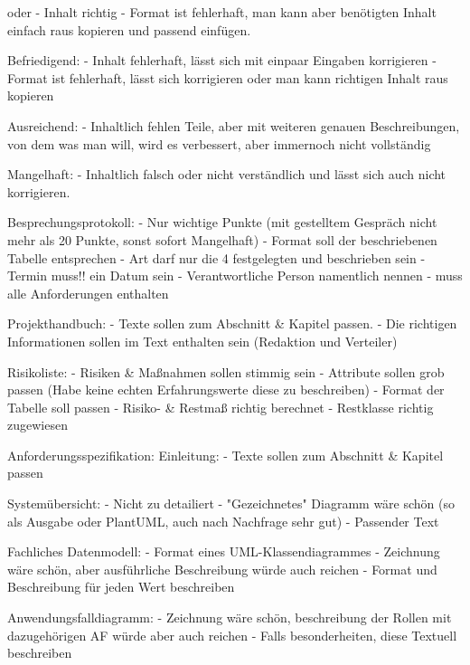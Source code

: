         oder
        - Inhalt richtig
        - Format ist fehlerhaft, man kann aber benötigten Inhalt einfach raus kopieren und passend einfügen.
        
        Befriedigend:
        - Inhalt fehlerhaft, lässt sich mit einpaar Eingaben korrigieren
        - Format ist fehlerhaft, lässt sich korrigieren oder man kann richtigen Inhalt raus kopieren
        
        Ausreichend:
        - Inhaltlich fehlen Teile, aber mit weiteren genauen Beschreibungen, von dem was man will, wird es verbessert, aber 
        immernoch nicht vollständig
        
        Mangelhaft:
        - Inhaltlich falsch oder nicht verständlich und lässt sich auch nicht korrigieren.
        
        Besprechungsprotokoll:
        - Nur wichtige Punkte (mit gestelltem Gespräch nicht mehr als 20 Punkte, sonst sofort Mangelhaft)
        - Format soll der beschriebenen Tabelle entsprechen
        - Art darf nur die 4 festgelegten und beschrieben sein
        - Termin muss!! ein Datum sein
        - Verantwortliche Person namentlich nennen
        - muss alle Anforderungen enthalten
        
        Projekthandbuch:
        - Texte sollen zum Abschnitt \& Kapitel passen.
        - Die richtigen Informationen sollen im Text enthalten sein (Redaktion und Verteiler)
        
        Risikoliste:
        - Risiken \& Maßnahmen sollen stimmig sein
        - Attribute sollen grob passen (Habe keine echten Erfahrungswerte diese zu beschreiben)
        - Format der Tabelle soll passen
        - Risiko- \& Restmaß richtig berechnet
        - Restklasse richtig zugewiesen
        
        Anforderungsspezifikation:
            Einleitung:
            - Texte sollen zum Abschnitt \&  Kapitel passen
        
            Systemübersicht:
            - Nicht zu detailiert
            - "Gezeichnetes" Diagramm wäre schön (so als Ausgabe oder PlantUML, auch nach Nachfrage sehr gut)
            - Passender Text
        
            Fachliches Datenmodell:
            - Format eines UML-Klassendiagrammes
            - Zeichnung wäre schön, aber ausführliche Beschreibung würde auch reichen
            - Format und Beschreibung für jeden Wert beschreiben
        
            Anwendungsfalldiagramm:
            - Zeichnung wäre schön, beschreibung der Rollen mit dazugehörigen AF würde aber auch reichen
            - Falls besonderheiten, diese Textuell beschreiben
        
